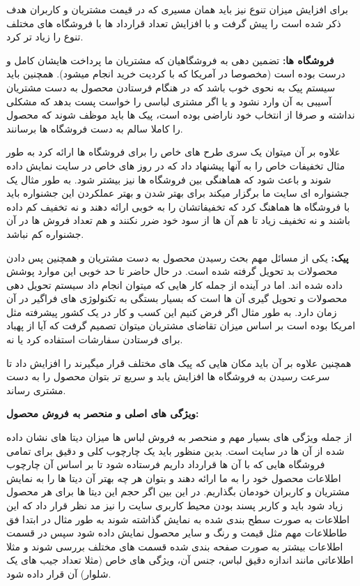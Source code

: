 \documentclass[12pt,a4paper]{article}
\begin{document}
	
	برای افزایش میزان تنوع نیز باید همان مسیری که در قیمت مشتریان و کاربران هدف ذکر شده است را پیش گرفت و با افزایش تعداد قرارداد ها با فروشگاه های مختلف تنوع را زیاد تر کرد.
	
	
	\textbf{فروشگاه ها: }تضمین دهی به فروشگاهیان که مشتریان ما پرداخت هایشان کامل و درست بوده است (مخصوصا در آمریکا که با کردیت خرید انجام میشود). همچنین باید سیستم پیک به نحوی خوب باشد که در هنگام فرستادن محصول به دست مشتریان آسیبی به آن وارد نشود و یا اگر مشتری لباسی را خواست پست بدهد که مشکلی نداشته و صرفا از انتخاب خود ناراضی بوده است، پیک ها باید موظف شوند که محصول را کاملا سالم به دست فروشگاه ها برسانند.
	
	
	علاوه بر آن میتوان یک سری طرح های خاص را برای فروشگاه ها ارائه کرد به طور مثال تخفیفات خاص را به آنها پیشنهاد داد که در روز های خاص در سایت نمایش داده شوند و باعث شود که هماهنگی بین فروشگاه ها نیز بیشتر شود. به طور مثال یک جشنواره ای سایت ما برگزار میکند برای بهتر شدن و بهتر عملکردن این جشنواره باید با فروشگاه ها هماهنگ کرد که تخفیفاتشان را به خوبی ارائه دهند و نه تخفیف کم داده باشند و نه تخفیف زیاد تا هم آن ها از سود خود ضرر نکنند و هم تعداد فروش ها در آن جشنواره کم نباشد.
	
	
\textbf{پیک: }یکی از مسائل مهم بحث رسیدن محصول به دست مشتریان و همچنین پس دادن محصولات بد تحویل گرفته شده است. در حال حاضر تا حد خوبی این موارد پوشش داده شده اند. اما در آینده از جمله کار هایی که میتوان انجام داد سیستم تحویل دهی محصولات و تحویل گیری آن ها است که بسیار بستگی به تکنولوژی های فراگیر در آن زمان دارد. به طور مثال اگر فرض کنیم این کسب و کار در یک کشور پیشرفته مثل امریکا بوده است بر اساس میزان تقاضای مشتریان میتوان تصمیم گرفت که آیا از پهباد برای فرستادن سفارشات استفاده کرد یا نه.


	همچنین علاوه بر آن باید مکان هایی که پیک های مختلف قرار میگیرند را افزایش داد تا سرعت رسیدن به فروشگاه ها افزایش یابد و سریع تر بتوان محصول را به دست مشتری رساند.
	
	
	\textbf{ویژگی های اصلی و منحصر به فروش محصول:}
	
	
	از جمله ویژگی های بسیار مهم و منحصر به فروش لباس ها میزان دیتا های نشان داده شده از آن ها در سایت است. بدین منظور باید یک چارچوب کلی و دقیق برای تمامی فروشگاه هایی که با آن ها قرارداد داریم فرستاده شود تا بر اساس آن چارچوب اطلاعات محصول خود را به ما ارائه دهند و بتوان هر چه بهتر آن دیتا ها را به نمایش مشتریان و کاربران خودمان بگذاریم. در این بین اگر حجم این دیتا ها برای هر محصول زیاد شود باید  و کاربر پسند بودن محیط کاربری سایت را نیز مد نظر قرار داد که این اطلاعات به صورت سطح بندی شده به نمایش گذاشته شوند به طور مثال در ابتدا فق طاطلاعات مهم مثل قیمت و رنگ و سایر محصول نمایش داده شود سپس در قسمت اطلاعات بیشتر به صورت صفحه بندی شده قسمت های مختلف بررسی شوند و مثلا اطلاعاتی مانند اندازه دقیق لباس، جنس آن، ویژگی های خاص (مثلا تعداد جیب های یک شلوار) آن قرار داده شود.
	
\end{document}
